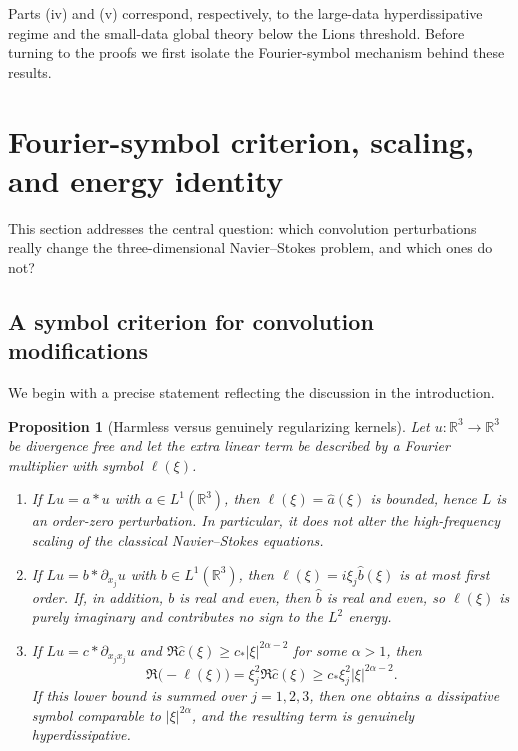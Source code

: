 \documentclass[11pt]{article}
\newtheorem{proposition}[theorem]{Proposition}
\theoremstyle{definition}
\theoremstyle{remark}
\newcommand{\R}{\mathbb{R}}
\begin{document}
Parts (iv) and (v) correspond, respectively, to the large-data hyperdissipative regime and the small-data global theory below the Lions threshold. Before turning to the proofs we first isolate the Fourier-symbol mechanism behind these results.

\section{Fourier-symbol criterion, scaling, and energy identity}\label{sec:criterion}

This section addresses the central question: which convolution perturbations really change the three-dimensional Navier--Stokes problem, and which ones do not?

\subsection{A symbol criterion for convolution modifications}

We begin with a precise statement reflecting the discussion in the introduction.

\begin{proposition}[Harmless versus genuinely regularizing kernels]\label{prop:criterion}
Let $u:\R^3\to\R^3$ be divergence free and let the extra linear term be described by a Fourier multiplier with symbol $\ell(\xi)$.
\begin{enumerate}[label=(\roman*)]
\item If $Lu=a*u$ with $a\in L^1(\R^3)$, then $\ell(\xi)=\hat a(\xi)$ is bounded, hence $L$ is an order-zero perturbation. In particular, it does not alter the high-frequency scaling of the classical Navier--Stokes equations.
\item If $Lu=b*\partial_{x_j}u$ with $b\in L^1(\R^3)$, then $\ell(\xi)=i\xi_j \hat b(\xi)$ is at most first order. If, in addition, $b$ is real and even, then $\hat b$ is real and even, so $\ell(\xi)$ is purely imaginary and contributes no sign to the $L^2$ energy.
\item If $Lu=c*\partial_{x_jx_j}u$ and $\Re\hat c(\xi)\ge c_\ast |\xi|^{2\alpha-2}$ for some $\alpha>1$, then
\[
\Re\bigl(-\ell(\xi)\bigr)
=
\xi_j^2 \Re \hat c(\xi)
\ge
c_\ast \xi_j^2 |\xi|^{2\alpha-2}.
\]
If this lower bound is summed over $j=1,2,3$, then one obtains a dissipative symbol comparable to $|\xi|^{2\alpha}$, and the resulting term is genuinely hyperdissipative.
\end{enumerate}
\end{proposition}
\end{document}
